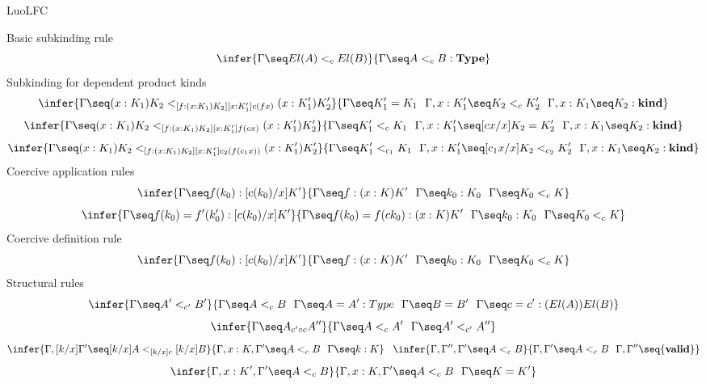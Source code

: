 	
	\begin{entry}{LuoLFC}
	
	
	
	\begin{calculus}
	
\centering
Basic subkinding rule
$$
\infer{\Gamma\seq El(A)<_cEl(B)}{\Gamma\seq A<_cB:{\bf Type}}
$$
Subkinding for dependent product kinds
$$\infer{\Gamma\seq (x:K_1)K_2<_{[f:(x:K_1)K_2][x:K'_1]c(fx)}(x:K'_1)K'_2}
{\Gamma\seq K'_1=K_1\!\quad\!\Gamma, x:K'_1\seq K_2<_cK'_2
\!\quad\!\Gamma, x:K_1\seq K_2:{\bf kind}}$$
$$\infer{\Gamma\seq (x:K_1)K_2<_{[f:(x:K_1)K_2][x:K'_1]f(cx)}(x:K'_1)K'_2}
{\Gamma\seq K'_1<_cK_1\!\quad\!\Gamma, x:K'_1\seq [cx/x]K_2=K'_2
\!\quad\!\Gamma, x:K_1\seq K_2:{\bf kind}}$$
$$\infer{\Gamma\seq (x:K_1)K_2<_{[f:(x:K_1)K_2][x:K'_1]c_2(f(c_1x))}(x:K'_1)K'_2}
{\Gamma\seq K'_1<_{c_1}K_1\!\quad\!\Gamma, x:K'_1\seq [c_1x/x]K_2<_{c_2}K'_2
\!\quad\!\Gamma, x:K_1\seq K_2:{\bf kind}}$$
Coercive application rules
$$\infer{\Gamma\seq f(k_0):[c(k_0)/x]K'}{\Gamma\seq f:(x:K)K'\!\quad\!\Gamma\seq k_0:K_0\!\quad\!
\Gamma\seq K_0<_cK}$$
$$\infer{\Gamma\seq f(k_0)=f'(k'_0):[c(k_0)/x]K'}
{\Gamma\seq f(k_0)=f(ck_0):(x:K)K'\!\quad\!\Gamma\seq k_0:K_0\!\quad\!
\Gamma\seq K_0<_cK}$$
Coercive definition rule
$$\infer{\Gamma\seq f(k_0):[c(k_0)/x]K'}
{\Gamma\seq f:(x:K)K'\!\quad\!\Gamma\seq k_0:K_0\!\quad\!\Gamma\seq K_0<_cK}$$
Structural rules
$$
\infer{\Gamma\seq A'<_{c'}B'}{\Gamma\seq A<_cB\!\quad\!\Gamma\seq A=A':Type
\!\quad\!\Gamma\seq B=B'\!\quad\!\Gamma\seq c=c':(El(A))El(B)}
$$
$$\infer{\Gamma\seq A_{c'\circ c}A''}{\Gamma\seq A<_cA'\!\quad\!\Gamma\seq A'<_{c'}A''}$$
$$\infer{\Gamma, [k/x]\Gamma'\seq [k/x]A<_{[k/x]c}[k/x]B}{\Gamma, x:K, \Gamma'\seq A<_c B
\!\quad\!\Gamma\seq k:K}\,\,\,\,\,\infer{\Gamma, \Gamma'',\Gamma'\seq A<_cB}{\Gamma, \Gamma'\seq A<_cB\!\quad\!\Gamma, 
\Gamma''\seq {\bf valid}}$$
$$\infer{\Gamma, x:K', \Gamma'\seq A<_c B}{\Gamma, x:K, \Gamma'\seq A<_c B
\!\quad\!\Gamma \seq K=K'}$$
	
	\end{calculus}
	
	

\end{entry}
